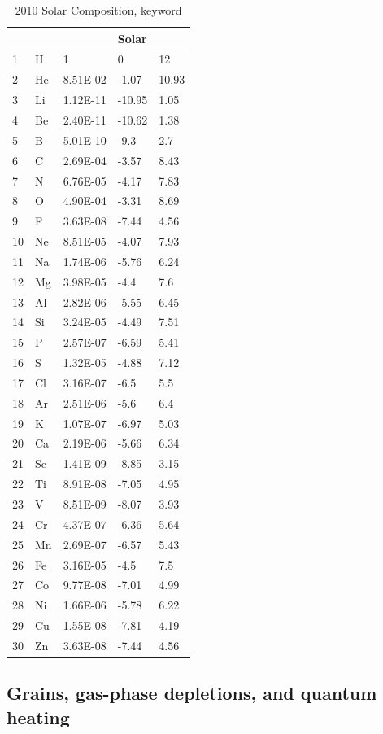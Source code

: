 \begin{table}
\centering
\caption{2010 Solar Composition, keyword \protect{}}
\label{tab:2010SolarComposition}
\begin{tabular}{lllll}
\hline
&&&Solar\\
\hline
1& H& 1& 0& 12\\
2& He& 8.51E-02& -1.07& 10.93\\
3& Li& 1.12E-11& -10.95& 1.05\\
4& Be& 2.40E-11& -10.62& 1.38\\
5& B& 5.01E-10& -9.3& 2.7\\
6& C& 2.69E-04& -3.57& 8.43\\
7& N& 6.76E-05& -4.17& 7.83\\
8& O& 4.90E-04& -3.31& 8.69\\
9& F& 3.63E-08& -7.44& 4.56\\
10& Ne& 8.51E-05& -4.07& 7.93\\
11& Na& 1.74E-06& -5.76& 6.24\\
12& Mg& 3.98E-05& -4.4& 7.6\\
13& Al& 2.82E-06& -5.55& 6.45\\
14& Si& 3.24E-05& -4.49& 7.51\\
15& P& 2.57E-07& -6.59& 5.41\\
16& S& 1.32E-05& -4.88& 7.12\\
17& Cl& 3.16E-07& -6.5& 5.5\\
18& Ar& 2.51E-06& -5.6& 6.4\\
19& K& 1.07E-07& -6.97& 5.03\\
20& Ca& 2.19E-06& -5.66& 6.34\\
21& Sc& 1.41E-09& -8.85& 3.15\\
22& Ti& 8.91E-08& -7.05& 4.95\\
23& V& 8.51E-09& -8.07& 3.93\\
24& Cr& 4.37E-07& -6.36& 5.64\\
25& Mn& 2.69E-07& -6.57& 5.43\\
26& Fe& 3.16E-05& -4.5& 7.5\\
27& Co& 9.77E-08& -7.01& 4.99\\
28& Ni& 1.66E-06& -5.78& 6.22\\
29& Cu& 1.55E-08& -7.81& 4.19\\
30& Zn& 3.63E-08& -7.44& 4.56\\
\hline
\end{tabular}
\end{table}

\subsection{Grains, gas-phase depletions, and quantum heating}

